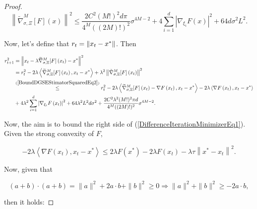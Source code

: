 \begin{proof}
\begin{equation}\label{BoundDGSEStimatorSquaredEq2}
 \left\|\widetilde{\nabla}_{\sigma, \Xi}^{M}[F](x)\right\|^{2} \leq \frac{2 C^{2}(M !)^{2} d \pi}{4^{M}((2 M) !)^{2}} \sigma^{4 M-2} + 4 \sum_{i=1}^{d}\left|\nabla_{\xi_{i}} F(x)\right|^{2} +  64 d \sigma^2 L^2.
\end{equation}

Now, let's define that $r_t = \left\lVert x_t - x^*\right\rVert$. Then

\begin{equation}\label{DifferenceIterationMinimizerEq1}
 \begin{aligned} 
 r_{t+1}^{2}
 & = \left\lVert x_{t}-\lambda \widetilde{\nabla}_{\sigma, \Xi}^{M} [F]\left(x_{t}\right)-x^{*}\right\rVert^{2} \\
 & = r_{t}^{2}-2 \lambda\left\langle\widetilde{\nabla}_{\sigma, \Xi}^{M}[F]\left(x_{t}\right), x_{t}-x^{*}\right\rangle+\lambda^{2}\left\lVert\tilde{\nabla}_{\sigma, \Xi}^{M}[F]\left(x_{t}\right)\right\rVert^{2} \\ 
 & \stackrel{(\ref{BoundDGSEStimatorSquaredEq2})}{\leq} r_{t}^{2}-2 \lambda\left\langle\widetilde{\nabla}_{\sigma, \Xi}^{M}[F]\left(x_{t}\right)-\nabla F\left(x_{t}\right), x_{t}-x^{*}\right\rangle-2 \lambda\left\langle\nabla F\left(x_{t}\right), x_{t}-x^{*}\right\rangle \\ 
 & +4 \lambda^{2} \sum_{i=1}^{d}\left|\nabla_{\xi_{i}} F\left(x_{t}\right)\right|^{2}+64 \lambda^{2} L^{2} d \sigma^{2}+\frac{2 C^{2} \lambda^{2}(M !)^{2} \pi d}{4^{M}((2 M) !)^{2}} \sigma^{4 M-2}. 
 \end{aligned} 
\end{equation}

Now, the aim is to bound the right side of (\ref{DifferenceIterationMinimizerEq1}). Given the strong convexity of $F$, 

\begin{equation}
 -2 \lambda\left\langle\nabla F\left(x_{t}\right), x_{t}-x^{*}\right\rangle \leq 2 \lambda F\left(x^{*}\right)-2 \lambda F\left(x_{t}\right)-\lambda \tau\left\|x^{*}-x_{t}\right\|^{2} . 
\end{equation}

Now, given that

\begin{equation*}
	(a+b)\cdot (a+b)=\|a\|^2+2a\cdot b+\|b\|^2 \geq 0 \Longrightarrow  \|a\|^2+\|b\|^2 \geq -2a\cdot b,
\end{equation*}

then it holds:


\end{proof}
